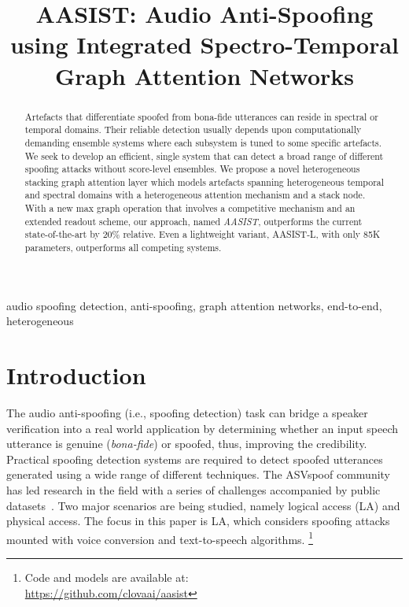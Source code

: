\documentclass{article}
\title{AASIST: Audio Anti-Spoofing using Integrated Spectro-Temporal \\Graph Attention Networks}
\newcommand\blfootnote[1]{\begingroup
  \renewcommand\thefootnote{}\footnote{#1}\addtocounter{footnote}{-1}\endgroup
}
\begin{document}
\ninept
\maketitle

\begin{abstract}
Artefacts that differentiate spoofed from bona-fide utterances can reside in spectral or temporal domains.
Their reliable detection usually depends upon computationally demanding ensemble systems where each subsystem is tuned to some specific artefacts. 
We seek to develop an efficient, single system that can detect a broad range of different spoofing attacks without score-level ensembles. 
We propose a novel heterogeneous stacking graph attention layer which models artefacts spanning heterogeneous temporal and spectral domains with a heterogeneous attention mechanism and a stack node.
With a new max graph operation that involves a competitive mechanism and an extended readout scheme, our approach, named {\em AASIST}, outperforms the current state-of-the-art by 20\% relative. 
Even a lightweight variant, AASIST-L, with only 85K parameters, outperforms all competing systems.

\end{abstract}
\begin{keywords}
audio spoofing detection, anti-spoofing, graph attention networks, end-to-end, heterogeneous
\end{keywords}

\section{Introduction}
\label{sec:intro}
The audio anti-spoofing (i.e., spoofing detection) task can bridge a speaker verification into a real world application by determining whether an input speech utterance is genuine ({\em bona-fide}) or spoofed, thus, improving the credibility. 
Practical spoofing detection systems are required to detect spoofed utterances generated using a wide range of different techniques. 
The ASVspoof community has led research in the field with a series of challenges accompanied by public datasets~\cite{wu2015asvspoof,kinnunen2017asvspoof,todisco2019asvspoof,yamagishi2021asvspoof}.
Two major scenarios are being studied, namely logical access (LA) and physical access.
The focus in this paper is LA, which considers spoofing attacks mounted with voice conversion and text-to-speech algorithms.\blfootnote{Code and models are available at:\\\url{https://github.com/clovaai/aasist}}
\end{document}
